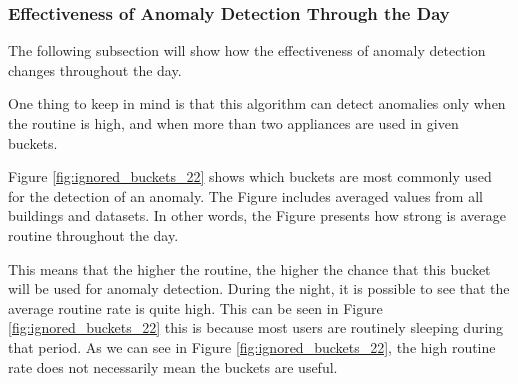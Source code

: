 \subsubsection{Effectiveness of Anomaly Detection Through the Day}

The following subsection will show how the effectiveness of anomaly detection changes throughout the day.

One thing to keep in mind is that this algorithm can detect anomalies only when
the routine is high, and when more than two appliances are used in given buckets.

Figure \ref{fig:ignored_buckets_22} shows which buckets are most commonly used for the detection of an anomaly.
The Figure includes averaged values from all buildings and datasets. 
In other words, the Figure presents how strong is average routine throughout the day.

This means that the higher the routine, the higher the chance that this bucket will be used for anomaly detection.
During the night, it is possible to see that the average routine rate is quite high.
This can be seen in Figure \ref{fig:ignored_buckets_22}
this is because most users are routinely sleeping during that period.
As we can see in Figure \ref{fig:ignored_buckets_22},
the high routine rate does not necessarily mean the buckets are useful.


